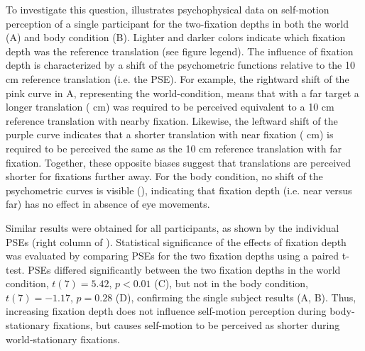 To investigate this question,  illustrates psychophysical data on self-motion perception of a single participant for the two-fixation depths in both the world (A) and body condition (B). Lighter and darker colors indicate which fixation depth was the reference translation (see figure legend). The influence of fixation depth is characterized by a shift of the psychometric functions relative to the 10 \si{\centi\metre} reference translation (i.e. the PSE). For example, the rightward shift of the pink curve in A, representing the world-condition, means that with a far target a longer translation ( \si{\centi\metre}) was required to be perceived equivalent to a 10 \si{\centi\metre} reference translation with nearby fixation. Likewise, the leftward shift of the purple curve indicates that a shorter translation with near fixation ( \si{\centi\metre}) is required to be perceived the same as the 10 \si{\centi\metre} reference translation with far fixation. Together, these opposite biases suggest that translations are perceived shorter for fixations further away. For the body condition, no shift of the psychometric curves is visible (), indicating that fixation depth (i.e. near versus far) has no effect in absence of eye movements.

Similar results were obtained for all participants, as shown by the individual PSEs (right column of ). Statistical significance of the effects of fixation depth was evaluated by comparing PSEs for the two fixation depths using a paired t-test. PSEs  differed significantly between the two fixation depths in the world condition, $t(7) = 5.42$, $p < 0.01$ (C), but not in the body condition, $t(7) = -1.17$, $p = 0.28$ (D), confirming the single subject results (A, B). Thus, increasing fixation depth does not influence self-motion perception during body-stationary fixations, but causes self-motion to be perceived as shorter during world-stationary fixations.

